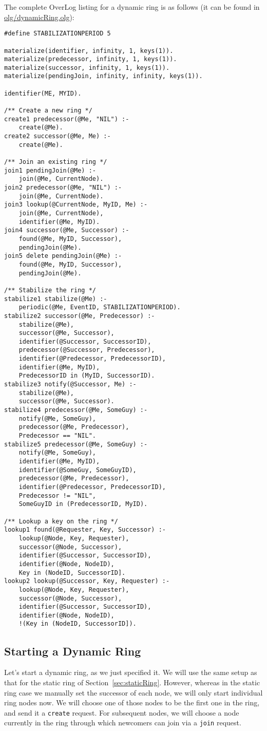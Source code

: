 \documentclass{article}
\begin{document}
The complete OverLog listing for a dynamic ring is as follows (it can be
found in \url{olg/dynamicRing.olg}):
\begin{lstlisting}
#define STABILIZATIONPERIOD 5

materialize(identifier, infinity, 1, keys(1)).
materialize(predecessor, infinity, 1, keys(1)).
materialize(successor, infinity, 1, keys(1)).
materialize(pendingJoin, infinity, infinity, keys(1)).

identifier(ME, MYID).

/** Create a new ring */
create1 predecessor(@Me, "NIL") :-
	create(@Me).
create2 successor(@Me, Me) :-
	create(@Me).

/** Join an existing ring */
join1 pendingJoin(@Me) :-
	join(@Me, CurrentNode).
join2 predecessor(@Me, "NIL") :-
	join(@Me, CurrentNode).
join3 lookup(@CurrentNode, MyID, Me) :-
	join(@Me, CurrentNode),
	identifier(@Me, MyID).
join4 successor(@Me, Successor) :-
	found(@Me, MyID, Successor),
	pendingJoin(@Me).
join5 delete pendingJoin(@Me) :-
	found(@Me, MyID, Successor),
	pendingJoin(@Me).

/** Stabilize the ring */
stabilize1 stabilize(@Me) :-
	periodic(@Me, EventID, STABILIZATIONPERIOD).
stabilize2 successor(@Me, Predecessor) :-
	stabilize(@Me),
	successor(@Me, Successor),
	identifier(@Successor, SuccessorID),
	predecessor(@Successor, Predecessor),
	identifier(@Predecessor, PredecessorID),
	identifier(@Me, MyID),
	PredecessorID in (MyID, SuccessorID).
stabilize3 notify(@Successor, Me) :-
	stabilize(@Me),
	successor(@Me, Successor).
stabilize4 predecessor(@Me, SomeGuy) :-
	notify(@Me, SomeGuy),
	predecessor(@Me, Predecessor),
	Predecessor == "NIL".
stabilize5 predecessor(@Me, SomeGuy) :-
	notify(@Me, SomeGuy),
	identifier(@Me, MyID),
	identifier(@SomeGuy, SomeGuyID),
	predecessor(@Me, Predecessor),
	identifier(@Predecessor, PredecessorID),
	Predecessor != "NIL",
	SomeGuyID in (PredecessorID, MyID).

/** Lookup a key on the ring */
lookup1 found(@Requester, Key, Successor) :-
	lookup(@Node, Key, Requester),
	successor(@Node, Successor),
	identifier(@Successor, SuccessorID),
	identifier(@Node, NodeID),
	Key in (NodeID, SuccessorID].
lookup2 lookup(@Successor, Key, Requester) :-
	lookup(@Node, Key, Requester),
	successor(@Node, Successor),
	identifier(@Successor, SuccessorID),
	identifier(@Node, NodeID),
	!(Key in (NodeID, SuccessorID]).
\end{lstlisting}


\subsection{Starting a Dynamic Ring}
Let's start a dynamic ring, as we just specified it. We will use the
same setup as that for the static ring of
Section~\ref{sec:staticRing}. However, whereas in the static ring case
we manually set the successor of each node, we will only start
individual ring nodes now. We will choose one of those nodes to be the
first one in the ring, and send it a \lstinline$create$ request. For
subsequent nodes, we will choose a node currently in the ring through
which newcomers can join via a \lstinline$join$ request.
\end{document}
